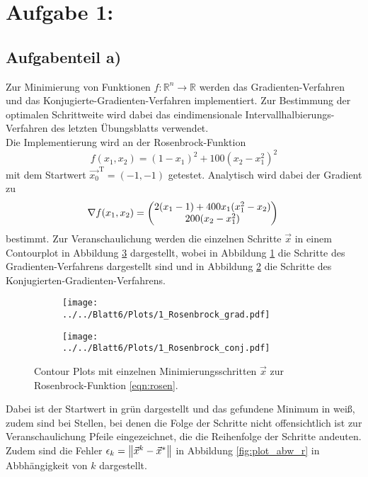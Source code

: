 \section*{Aufgabe 1: }

\subsection*{Aufgabenteil a)}

Zur Minimierung von Funktionen $f: \mathbb{R}^n\to \mathbb{R}$ werden das Gradienten-Verfahren und das
Konjugierte-Gradienten-Verfahren implementiert. Zur Bestimmung der optimalen Schrittweite wird dabei das
eindimensionale Intervallhalbierungs-Verfahren des letzten Übungsblatts verwendet. \\
Die Implementierung wird an der Rosenbrock-Funktion
\begin{equation}
  f(x_1,x_2)=(1-x_1)^2+100(x_2-x_1^2)^2
  \label{eqn:rosen}
\end{equation}
mit dem Startwert $\vec{x_0}^{\text{T}}=(-1,-1)$ getestet. Analytisch wird dabei der Gradient zu
\begin{equation}
  \nabla f(x_1,x_2)=
  \begin{pmatrix}
    2(x_1-1)+400x_1(x_1^2-x_2) \\
    200(x_2-x_1^2)
  \end{pmatrix} \\
\end{equation}
bestimmt.
Zur Veranschaulichung werden die einzelnen Schritte $\vec{x}$ in einem Contourplot in Abbildung \ref{fig:contour1}
dargestellt, wobei in Abbildung \ref{fig:contour1a} die Schritte des Gradienten-Verfahrens dargestellt sind und in
Abbildung \ref{fig:contour1b} die Schritte des Konjugierten-Gradienten-Verfahrens.
\begin{figure}[H]
\begin{subfigure}[c]{0.5\textwidth}
\texttt{[image: ../../Blatt6/Plots/1\_Rosenbrock\_grad.pdf]}
\label{fig:contour1a}
\end{subfigure}
\begin{subfigure}[c]{0.5\textwidth}
\texttt{[image: ../../Blatt6/Plots/1\_Rosenbrock\_conj.pdf]}
\label{fig:contour1b}
\end{subfigure}
\caption{Contour Plots mit einzelnen Minimierungsschritten $\vec{x}$ zur Rosenbrock-Funktion \eqref{eqn:rosen}.}
\label{fig:contour1}
\end{figure}
Dabei ist der Startwert in grün dargestellt und das gefundene Minimum in weiß, zudem sind bei Stellen, bei denen die Folge der Schritte nicht offensichtlich ist zur Veranschaulichung Pfeile eingezeichnet, die die Reihenfolge der Schritte andeuten. \\
Zudem sind die Fehler $\epsilon_k=\left\lVert\vec{x}^k-\vec{x}^*\right\rVert$ in Abbildung \ref{fig:plot_abw_r} in Abbhängigkeit von $k$ dargestellt.

